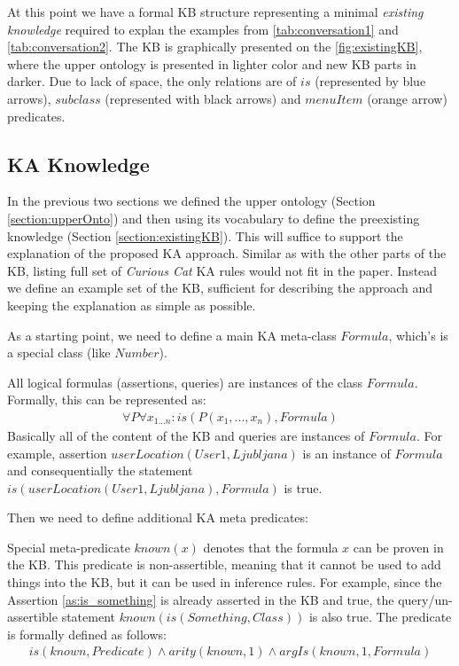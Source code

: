 At this point we have a formal KB structure representing a minimal 
\emph{existing knowledge} required to explan the examples from 
\autoref{tab:conversation1} and \autoref{tab:conversation2}. The KB is
graphically presented on the \autoref{fig:existingKB}, where the upper ontology
is presented in lighter color and new KB parts in darker. Due to lack of space,
the only relations are of $is$ (represented by blue arrows), $subclass$ 
(represented with black arrows) and $menuItem$ (orange arrow) predicates.

\subsection{KA Knowledge}
\label{section:kakb}
In the previous two sections we defined the upper ontology
(Section \ref{section:upperOnto}) and then using its vocabulary to define the 
preexisting knowledge (Section \ref{section:existingKB}). This will suffice to
support the explanation of the proposed KA approach. Similar as with the other
parts of the KB, listing full set of 
\emph{Curious Cat} KA rules would not fit in the paper. Instead we define an 
example set of the KB, sufficient for describing the approach and keeping the 
explanation as simple as possible. 

As a starting point, we need to define a main KA meta-class $Formula$, which’s 
is a special class (like $Number$).
\begin{definition}\label{def:formula}
All logical formulas (assertions, queries) are instances of the class $Formula$.
Formally, this can be represented as:
\begin{equation}\label{as:formulas}
\begin{gathered}
	\forall P\forall x_{1...n}:is(P(x_1,...,x_n),Formula)
\end{gathered}
\end{equation}
Basically all of the content of the KB and queries are instances of $Formula$.
For example, assertion $userLocation(User1,Ljubljana)$ is an instance of 
$Formula$ and consequentially the statement $is(userLocation(User1,Ljubljana),
Formula)$ is true.
\end{definition}

Then we need to define additional KA meta predicates:

\begin{definition}\label{def:pred_known}
Special meta-predicate $known(x)$ denotes that the formula $x$ can be proven 
in the KB. This predicate is non-assertible, meaning that it cannot be used
to add things into the KB, but it can be used in inference rules. For example,
since the Assertion \ref{as:is_something} is already asserted in the KB and 
true, the query/un-assertible statement $known(is(Something,Class))$ is also 
true. The predicate is formally defined as follows:
\begin{equation}\label{as:known}
\begin{gathered}
	is(known,Predicate) \land arity(known,1) \land argIs(known,1,Formula)
\end{gathered}
\end{equation}
\end{definition}

